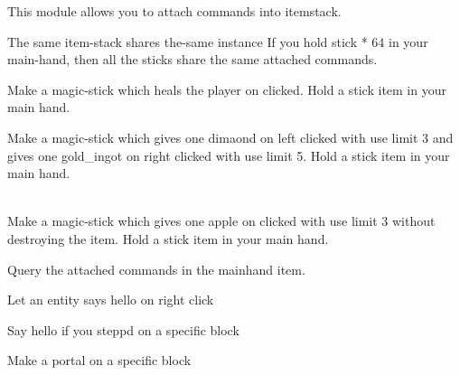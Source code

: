 
This module allows you to attach commands into itemstack.


\begin{note}{The same item-stack shares the-same instance}
    If you hold stick * 64 in your main-hand, then all the sticks share the same attached commands.
\end{note}

\begin{example}{Make a magic-stick which heals the player on clicked.}
    Hold a stick item in your main hand.\\
\end{example}

\begin{example}{Make a magic-stick which gives one dimaond on left clicked with use limit 3 and gives one gold\_ingot on right clicked with use limit 5.}
    Hold a stick item in your main hand.\\
    \\
\end{example}

\begin{example}{Make a magic-stick which gives one apple on clicked with use limit 3 without destroying the item.}
    Hold a stick item in your main hand.\\
\end{example}

\begin{example}{Query the attached commands in the mainhand item.}
\end{example}

\begin{example}{Let an entity says hello on right click}
\end{example}

\begin{example}{Say hello if you steppd on a specific block}
\end{example}

\begin{example}{Make a portal on a specific block}
\end{example}
